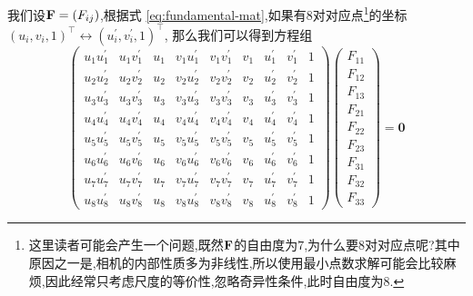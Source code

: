 我们设$\bold{F} = (F_{ij})$,根据式 \ref{eq:fundamental-mat},如果有8对对应点\footnote{这里读者可能会产生一个问题,既然$\bold{F}$的自由度为$7$,为什么要8对对应点呢?其中原因之一是,相机的内部性质多为非线性,所以使用最小点数求解可能会比较麻烦,因此经常只考虑尺度的等价性,忽略奇异性条件,此时自由度为8.}的坐标$(u_i, v_i, 1)^{\top} \leftrightarrow (u_i^\prime, v_i^\prime, 1)^{\top}$, 那么我们可以得到方程组
\begin{equation}
	\begin{pmatrix}
		u_{1} u_{1}^{\prime} & u_{1} v_{1}^{\prime} & u_{1} & v_{1} u_{1}^{\prime} & v_{1} v_{1}^{\prime} & v_{1} & u_{1}^{\prime} & v_{1}^{\prime} & 1 \\
		u_{2} u_{2}^{\prime} & u_{2} v_{2}^{\prime} & u_{2} & v_{2} u_{2}^{\prime} & v_{2} v_{2}^{\prime} & v_{2} & u_{2}^{\prime} & v_{2}^{\prime} & 1 \\
		u_{3} u_{3}^{\prime} & u_{3} v_{3}^{\prime} & u_{3} & v_{3} u_{3}^{\prime} & v_{3} v_{3}^{\prime} & v_{3} & u_{3}^{\prime} & v_{3}^{\prime} & 1 \\
		u_{4} u_{4}^{\prime} & u_{4} v_{4}^{\prime} & u_{4} & v_{4} u_{4}^{\prime} & v_{4} v_{4}^{\prime} & v_{4} & u_{4}^{\prime} & v_{4}^{\prime} & 1 \\
		u_{5} u_{5}^{\prime} & u_{5} v_{5}^{\prime} & u_{5} & v_{5} u_{5}^{\prime} & v_{5} v_{5}^{\prime} & v_{5} & u_{5}^{\prime} & v_{5}^{\prime} & 1 \\
		u_{6} u_{6}^{\prime} & u_{6} v_{6}^{\prime} & u_{6} & v_{6} u_{6}^{\prime} & v_{6} v_{6}^{\prime} & v_{6} & u_{6}^{\prime} & v_{6}^{\prime} & 1 \\
		u_{7} u_{7}^{\prime} & u_{7} v_{7}^{\prime} & u_{7} & v_{7} u_{7}^{\prime} & v_{7} v_{7}^{\prime} & v_{7} & u_{7}^{\prime} & v_{7}^{\prime} & 1 \\
		u_{8} u_{8}^{\prime} & u_{8} v_{8}^{\prime} & u_{8} & v_{8} u_{8}^{\prime} & v_{8} v_{8}^{\prime} & v_{8} & u_{8}^{\prime} & v_{8}^{\prime} & 1
	\end{pmatrix}
	\begin{pmatrix}
		F_{11} \\
		F_{12} \\
		F_{13} \\
		F_{21} \\
		F_{22} \\
		F_{23} \\
		F_{31} \\
		F_{32} \\
		F_{33}
	\end{pmatrix}
	= \bm 0
	\label{eq:8 points to solve F}
\end{equation}

